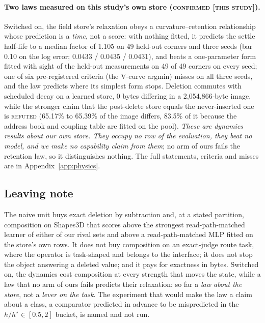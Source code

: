 \documentclass{article} %
\begin{document}
\paragraph{Two laws measured on this study's own store (\textsc{confirmed [this study]}).}
Switched on, the field store's relaxation obeys a curvature--retention relationship whose
prediction is a \emph{time}, not a score: with nothing fitted, it predicts the settle half-life to
a median factor of 1.105 on 49 held-out corners and three seeds (bar 0.10 on the log error; 0.0433
/ 0.0435 / 0.0431), and beats a one-parameter form fitted with sight of the held-out measurements
on 49 of 49 corners on every seed; one of six pre-registered criteria (the V-curve argmin) misses on
all three seeds, and the law predicts where its simplest form stops.
Deletion commutes with scheduled decay on a learned store, 0 bytes differing in a 2,054,866-byte
image, while the stronger claim that the post-delete store equals the never-inserted one is
\textsc{refuted} (65.17\% to 65.39\% of the image differs, 83.5\% of it because the address book
and coupling table are fitted on the pool). %
\emph{These are dynamics results about our own store. They occupy no row of the evaluation, they
beat no model, and we make no capability claim from them}; no arm of ours fails the retention law,
so it distinguishes nothing. The full statements, criteria and misses are in
Appendix~\ref{app:physics}.

\subsection{Leaving note}
\label{sec:leaving}

The naive unit buys exact deletion by subtraction and, at a stated partition, composition on
Shapes3D that scores above the strongest read-path-matched learner of either of our rival sets
and above a read-path-matched MLP fitted on the store's own rows. It does not buy composition on an exact-judge route task, where the operator is
task-shaped and belongs to the interface; it does not stop the object answering a deleted value;
and it pays for exactness in bytes. Switched on, the dynamics cost composition at every strength
that moves the state, while a law that no arm of ours fails predicts their relaxation: so far a
\emph{law about the store}, not a \emph{lever on the task}. The experiment that would make the law a
claim about a class, a comparator predicted in advance to be mispredicted in the
$h/h^\star\in[0.5,2]$ bucket, is named and not run. %
\end{document}
